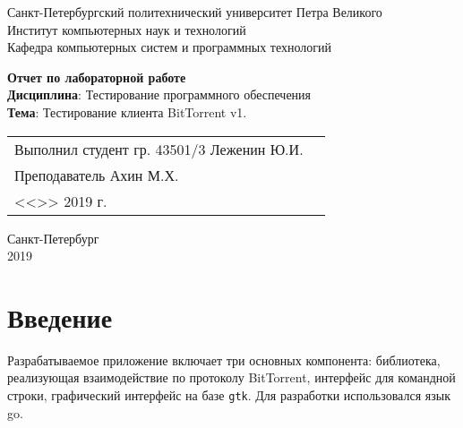 \documentclass[a4paper,14pt]{extarticle}
\begin{document}
    \begin{titlepage}
        \centering
        Санкт-Петербургский политехнический университет Петра Великого \\
        Институт компьютерных наук и технологий \\
        Кафедра компьютерных систем и программных технологий \\
        \vspace{5.5cm}

        {\centering \textbf{Отчет по лабораторной работе} \\
        \vspace{0.15cm}
        \textbf{Дисциплина}: Тестирование программного обеспечения  \\
        \vspace{0.15cm}
        \textbf{Тема}: Тестирование клиента BitTorrent v1.} \\

        \vspace{5.5cm}

        \begin{table}[H]
            \begin{tabular}{p{\textwidth}@{}r}
            {Выполнил студент гр. 43501/3} \hfill
            \vspace{0.2cm}
            Леженин Ю.И. \\ \vspace{0.2cm}
            Преподаватель \hfill
            \vspace{0.2cm}
            Ахин М.Х. \\
            \vspace{0.4cm}
            {} \hfill { <<\underline{\hspace{0.08\textwidth}}>> \underline{\hspace{0.2\textwidth}}2019 г.} \\
            \end{tabular}
        \end{table}
        \vfill
        {\centering Санкт-Петербург \\
        \vspace{0.15cm}
        2019}
    \end{titlepage}
    
\section*{Введение}    

Разрабатываемое приложение включает три основных компонента: библиотека, 
реализующая взаимодействие по протоколу BitTorrent, интерфейс для 
командной строки, графический интерфейс на базе \texttt{gtk}. Для разработки 
использовался язык go.
\end{document}
